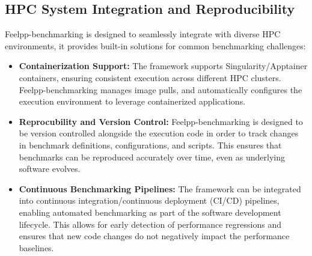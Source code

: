 \subsection{HPC System Integration and Reproducibility}

Feelpp-benchmarking is designed to seamlessly integrate with diverse HPC environments, it provides built-in solutions for common benchmarking challenges:

\begin{itemize}
\item \textbf{Containerization Support:} The framework supports Singularity/Apptainer containers, ensuring consistent execution across different HPC clusters. Feelpp-benchmarking manages image pulls, and automatically configures the execution environment to leverage containerized applications.
\item \textbf{Reprocubility and Version Control:} Feelpp-benchmarking is designed to be version controlled alongside the execution code in order to track changes in benchmark definitions, configurations, and scripts. This ensures that benchmarks can be reproduced accurately over time, even as underlying software evolves.
\item \textbf{Continuous Benchmarking Pipelines:} The framework can be integrated into continuous integration/continuous deployment (CI/CD) pipelines, enabling automated benchmarking as part of the software development lifecycle. This allows for early detection of performance regressions and ensures that new code changes do not negatively impact the performance baselines.
\end{itemize}


